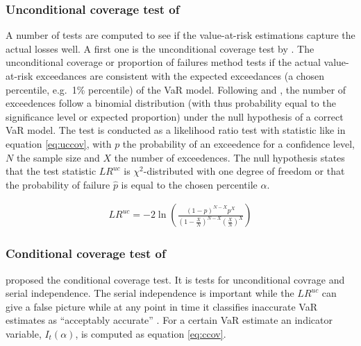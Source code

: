 \documentclass[a4paper, twoside]{templates/ociamthesis}
\begin{document}
\hypertarget{unconditional-coverage-test-of-kupiec1995}{%
\subsubsection{\texorpdfstring{Unconditional coverage test of \textcite{kupiec1995}}{Unconditional coverage test of @kupiec1995}}\label{unconditional-coverage-test-of-kupiec1995}}

\noindent A number of tests are computed to see if the value-at-risk estimations capture the actual losses well. A first one is the unconditional coverage test by \textcite{kupiec1995}. The unconditional coverage or proportion of failures method tests if the actual value-at-risk exceedances are consistent with the expected exceedances (a chosen percentile, e.g.~1\% percentile) of the VaR model. Following \textcite{kupiec1995} and \textcite{ghalanos2020}, the number of exceedences follow a binomial distribution (with thus probability equal to the significance level or expected proportion) under the null hypothesis of a correct VaR model. The test is conducted as a likelihood ratio test with statistic like in equation \eqref{eq:uccov}, with \(p\) the probability of an exceedence for a confidence level, \(N\) the sample size and \(X\) the number of exceedences. The null hypothesis states that the test statistic \(L R^{u c}\) is \(\chi^2\)-distributed with one degree of freedom or that the probability of failure \(\hat p\) is equal to the chosen percentile \(\alpha\).

\begin{align}
L R^{u c}=-2 \ln \left(\frac{(1-p)^{N-X} p^{X}}{\left(1-\frac{X}{N}\right)^{N-X}\left(\frac{X}{N}\right)^{X}}\right)
\label{eq:uccov}
\end{align}

\hypertarget{conditional-coverage-test-of-christoffersen2001}{%
\subsubsection{\texorpdfstring{Conditional coverage test of \textcite{christoffersen2001}}{Conditional coverage test of @christoffersen2001}}\label{conditional-coverage-test-of-christoffersen2001}}

\noindent \textcite{christoffersen2001} proposed the conditional coverage test. It is tests for unconditional covrage and serial independence. The serial independence is important while the \(L R^{u c}\) can give a false picture while at any point in time it classifies inaccurate VaR estimates as ``acceptably accurate'' \autocite{bali2007}. For a certain VaR estimate an indicator variable, \(I_t(\alpha)\), is computed as equation \eqref{eq:ccov}.
\end{document}
